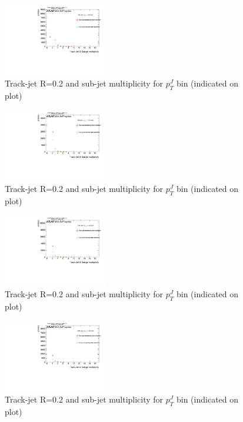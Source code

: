 \begin{figure}
 
\includegraphics[width=0.4\textwidth]{appendixB/mTAS_W_calibmCal_20:07:01-03-11-2016/13cfrt_h_SubJet_aftersel_ptJ04TAmult.pdf}
\caption{Track-jet R=0.2 and sub-jet multiplicity for $p_{T}^{J}$ bin (indicated on plot) }
 
\end{figure}
 
\begin{figure}
 
\includegraphics[width=0.4\textwidth]{appendixB/mTAS_W_calibmCal_20:07:01-03-11-2016/13cfrt_h_SubJet_aftersel_ptJ05TAmult.pdf}
\caption{Track-jet R=0.2 and sub-jet multiplicity for $p_{T}^{J}$ bin (indicated on plot) }
 
\end{figure}
 
\begin{figure}
 
\includegraphics[width=0.4\textwidth]{appendixB/mTAS_W_calibmCal_20:07:01-03-11-2016/13cfrt_h_SubJet_aftersel_ptJ06TAmult.pdf}
\caption{Track-jet R=0.2 and sub-jet multiplicity for $p_{T}^{J}$ bin (indicated on plot) }
 
\end{figure}
\begin{figure}
 
\includegraphics[width=0.4\textwidth]{appendixB/mTAS_W_calibmCal_20:07:01-03-11-2016/13cfrt_h_SubJet_aftersel_ptJ07TAmult.pdf}
\caption{Track-jet R=0.2 and sub-jet multiplicity for $p_{T}^{J}$ bin (indicated on plot) }
 
\end{figure}
 

